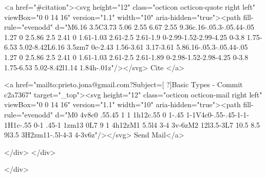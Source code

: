       <a  href="#citation"><svg height="12" class="octicon octicon-quote right left" viewBox="0 0 14 16" version="1.1" width="10" aria-hidden="true"><path fill-rule="evenodd" d="M6.16 3.5C3.73 5.06 2.55 6.67 2.55 9.36c.16-.05.3-.05.44-.05 1.27 0 2.5.86 2.5 2.41 0 1.61-1.03 2.61-2.5 2.61-1.9 0-2.99-1.52-2.99-4.25 0-3.8 1.75-6.53 5.02-8.42L6.16 3.5zm7 0c-2.43 1.56-3.61 3.17-3.61 5.86.16-.05.3-.05.44-.05 1.27 0 2.5.86 2.5 2.41 0 1.61-1.03 2.61-2.5 2.61-1.89 0-2.98-1.52-2.98-4.25 0-3.8 1.75-6.53 5.02-8.42l1.14 1.84h-.01z"/></svg> Cite
      </a>

      <a href="mailto:prieto.jona@gmail.com?Subject=[ ?]Basic Types - Commit c2a7367" target="_top"><svg height="12" class="octicon octicon-mail right left" viewBox="0 0 14 16" version="1.1" width="10" aria-hidden="true"><path fill-rule="evenodd" d="M0 4v8c0 .55.45 1 1 1h12c.55 0 1-.45 1-1V4c0-.55-.45-1-1-1H1c-.55 0-1 .45-1 1zm13 0L7 9 1 4h12zM1 5.5l4 3-4 3v-6zM2 12l3.5-3L7 10.5 8.5 9l3.5 3H2zm11-.5l-4-3 4-3v6z"/></svg> Send Mail</a>

    </div>
  </div>

</div>




